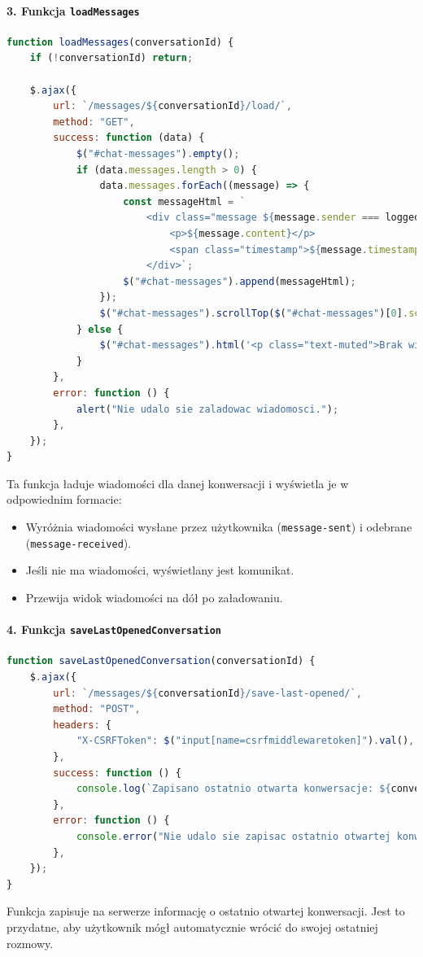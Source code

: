 \documentclass[12pt,a4paper,oneside]{article}
\theoremstyle{definition}
\numberwithin{equation}{section}
\begin{document}
\paragraph{3. Funkcja \texttt{loadMessages}}
\begin{lstlisting}[language=JavaScript, caption=Funkcja \texttt{loadMessages}]
function loadMessages(conversationId) {
    if (!conversationId) return;

    $.ajax({
        url: `/messages/${conversationId}/load/`,
        method: "GET",
        success: function (data) {
            $("#chat-messages").empty();
            if (data.messages.length > 0) {
                data.messages.forEach((message) => {
                    const messageHtml = `
                        <div class="message ${message.sender === loggedInUser ? "message-sent" : "message-received"}">
                            <p>${message.content}</p>
                            <span class="timestamp">${message.timestamp}</span>
                        </div>`;
                    $("#chat-messages").append(messageHtml);
                });
                $("#chat-messages").scrollTop($("#chat-messages")[0].scrollHeight);
            } else {
                $("#chat-messages").html('<p class="text-muted">Brak wiadomosci w tej konwersacji.</p>');
            }
        },
        error: function () {
            alert("Nie udalo sie zaladowac wiadomosci.");
        },
    });
}
\end{lstlisting}
Ta funkcja ładuje wiadomości dla danej konwersacji i wyświetla je w odpowiednim formacie:
\begin{itemize}
    \item Wyróżnia wiadomości wysłane przez użytkownika (\texttt{message-sent}) i odebrane (\texttt{message-received}).
    \item Jeśli nie ma wiadomości, wyświetlany jest komunikat.
    \item Przewija widok wiadomości na dół po załadowaniu.
\end{itemize}



\paragraph{4. Funkcja \texttt{saveLastOpenedConversation}}
\begin{lstlisting}[language=JavaScript, caption=Funkcja \texttt{saveLastOpenedConversation}]
function saveLastOpenedConversation(conversationId) {
    $.ajax({
        url: `/messages/${conversationId}/save-last-opened/`,
        method: "POST",
        headers: {
            "X-CSRFToken": $("input[name=csrfmiddlewaretoken]").val(),
        },
        success: function () {
            console.log(`Zapisano ostatnio otwarta konwersacje: ${conversationId}`);
        },
        error: function () {
            console.error("Nie udalo sie zapisac ostatnio otwartej konwersacji.");
        },
    });
}
\end{lstlisting}
Funkcja zapisuje na serwerze informację o ostatnio otwartej konwersacji. Jest to przydatne, aby użytkownik mógł automatycznie wrócić do swojej ostatniej rozmowy.
\end{document}
